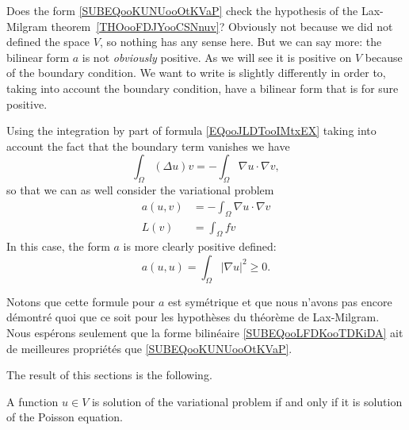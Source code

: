 Does the form \eqref{SUBEQooKUNUooOtKVaP} check the hypothesis of the Lax-Milgram theorem~\ref{THOooFDJYooCSNnuv}? Obviously not because we did not defined the space \( V\), so nothing has any sense here. But we can say more: the bilinear form \( a\) is not \emph{obviously} positive. As we will see it is positive on \( V\) because of the boundary condition. We want to write is slightly differently in order to, taking into account the boundary condition, have a bilinear form that is for sure positive.

Using the integration by part of formula \eqref{EQooJLDTooIMtxEX} taking into account the fact that the boundary term vanishes we have
\begin{equation}
    \int_{\Omega}(\Delta u)v=-\int_{\Omega}\nabla u\cdot \nabla v,
\end{equation}
so that we can as well consider the variational problem
\begin{subequations}
    \begin{align}
        a(u,v)&=-\int_{\Omega}\nabla u\cdot \nabla v   \label{SUBEQooLFDKooTDKiDA}\\
        L(v)&=\int_{\Omega}fv
    \end{align}
\end{subequations}
In this case, the form \( a\) is more clearly positive defined:
\begin{equation}
    a(u,u)=\int_{\Omega}| \nabla u |^2\geq 0.
\end{equation}

Notons que cette formule pour \( a\) est symétrique et que nous n'avons pas encore démontré quoi que ce soit pour les hypothèses du théorème de Lax-Milgram. Nous espérons seulement que la forme bilinéaire \eqref{SUBEQooLFDKooTDKiDA} ait de meilleures propriétés que \eqref{SUBEQooKUNUooOtKVaP}.

The result of this sections is the following.
\begin{proposition}
    A function \( u\in V\) is solution of the variational problem if and only if it is solution of the Poisson equation.
\end{proposition}

